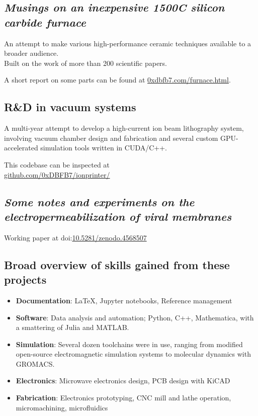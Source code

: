 \documentclass[fleqn,11pt]{article}
\begin{document}
{\begin{multicols}{1}
\subsection*{\textit{Musings on an inexpensive 1500\textdegree C silicon carbide furnace}}

An attempt to make various high-performance ceramic techniques available to a broader audience.\\ Built on the work of more than 200 scientific papers.

A short report on some parts can be found at \href{https://0xdbfb7.com/furnace.html}{0xdbfb7.com/furnace.html}.


\subsection*{R\&D in vacuum systems}

A multi-year attempt to develop a high-current ion beam lithography system, involving vacuum chamber design and fabrication and several custom GPU-accelerated simulation tools written in CUDA/C++. 

This codebase can be inspected at\\ \href{https://github.com/0xDBFB7/ionprinter/}{github.com/0xDBFB7/ionprinter/}


\subsection*{\textit{Some notes and experiments on the electropermeabilization of viral membranes}}

Working paper at doi:\href{https://doi.org/10.5281/zenodo.4568507}{10.5281/zenodo.4568507}





\subsection{Broad overview of skills gained from these projects}
\begin{itemize}
	\item \textbf{Documentation}: LaTeX, Jupyter notebooks, Reference management
	\item \textbf{Software}: Data analysis and automation; Python, C++, Mathematica, with a smattering of Julia and MATLAB.
	\item \textbf{Simulation}: Several dozen toolchains were in use, ranging from modified open-source electromagnetic simulation systems to molecular dynamics with GROMACS.
	\item \textbf{Electronics}: Microwave electronics design, PCB design with KiCAD
	\item \textbf{Fabrication}: Electronics prototyping, CNC mill and lathe operation, micromachining, microfluidics
\end{itemize}





\end{multicols}}
\end{document}
